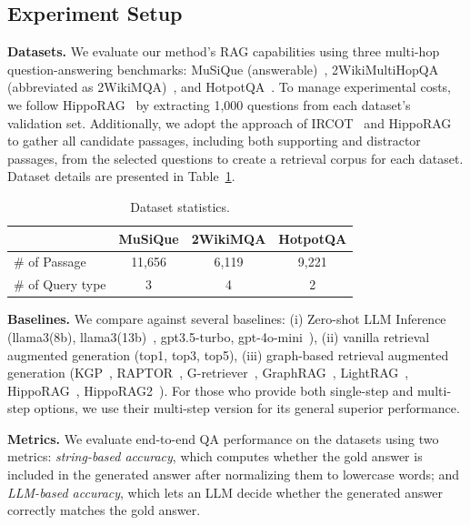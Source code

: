\documentclass[letterpaper]{article} %
\newcommand{\shengyuan}[1]{\todo[inline,size=\footnotesize,color=red!20]{\textbf{shengyuan}: #1}}
\begin{document}
\subsection{Experiment Setup}

\textbf{Datasets.} We evaluate our method's RAG capabilities using three multi-hop question-answering benchmarks: MuSiQue (answerable)~\cite{trivedi2022MuSiQue}, 2WikiMultiHopQA (abbreviated as 2WikiMQA)~\cite{2wikimqa}, and HotpotQA~\cite{yang2018hotpotqa}. To manage experimental costs, we follow HippoRAG~\cite{HippoRAG} by extracting 1,000 questions from each dataset's validation set. Additionally, we adopt the approach of IRCOT~\cite{IRCOT} and HippoRAG~\cite{HippoRAG} to gather all candidate passages, including both supporting and distractor passages, from the selected questions to create a retrieval corpus for each dataset. Dataset details are presented in Table~\ref{dataset_stat}.

\begin{table}[h]\small
    \centering
    \begin{tabular}{lccc}
        \toprule
        & MuSiQue & 2WikiMQA & HotpotQA \\
        \midrule
        \# of Passage & 11,656 & 6,119 & 9,221 \\
        \# of Query type &3&4&2\\
        \bottomrule
    \end{tabular}
    \caption{Dataset statistics.}
    \label{dataset_stat}
    \vspace{-1em}
\end{table}
\textbf{Baselines.} We compare against several baselines: (i) Zero-shot LLM Inference (llama3(8b), llama3(13b)~\cite{llamaindex_website}, gpt3.5-turbo, gpt-4o-mini~\cite{achiam2023gpt}), (ii) vanilla retrieval augmented generation (top1, top3, top5), (iii) graph-based retrieval augmented generation (KGP~\cite{wang2024knowledge}, RAPTOR~\cite{sarthi2024raptor}, G-retriever~\cite{he2024g}, GraphRAG~\cite{edge2024local}, LightRAG~\cite{guo2024lightrag}, HippoRAG~\cite{HippoRAG}, HippoRAG2~\cite{hipporag2}). For those who provide both single-step and multi-step options, we use their multi-step version for its general superior performance. 


\textbf{Metrics.} We evaluate end-to-end QA performance on the datasets using two metrics: \textit{string-based accuracy}, which computes whether the gold answer is included in the generated answer after normalizing them to lowercase words; and \textit{LLM-based accuracy}, which lets an LLM decide whether the generated answer correctly matches the gold answer.
\end{document}
